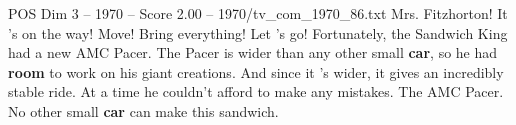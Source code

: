 \begin{textsample}{POS Dim 3 – 1970 – Score 2.00 – 1970/tv\_com\_1970\_86.txt}  \label{ex:f3_pos_039}
Mrs.
Fitzhorton!
It 's on the way!
Move!
Bring everything!
Let 's go!
Fortunately, the Sandwich King had a new AMC Pacer.
The Pacer is wider than any other small \textbf{car}, so he had \textbf{room} to work on his giant creations.
And since it 's wider, it gives an incredibly stable ride.
At a time he couldn't afford to make any mistakes.
The AMC Pacer.
No other small \textbf{car} can make this sandwich.

\end{textsample}
